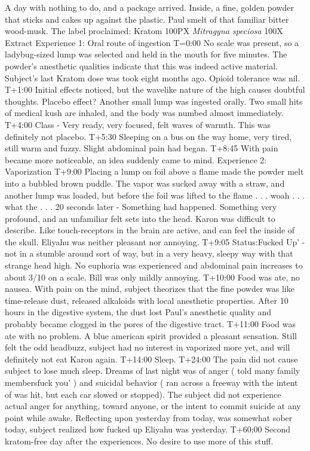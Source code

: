 \documentclass[12pt]{book}
\begin{document}
A day with nothing to do, and a package arrived. Inside, a fine, golden powder that sticks and cakes up against the plastic. Paul smelt of that familiar bitter wood-musk. The label proclaimed: Kratom 100PX \emph{Mitragyna speciosa} 100X Extract Experience 1: Oral route of ingestion T=0:00 No scale was present, so a ladybug-sized lump was selected and held in the mouth for five minutes. The powder's anesthetic qualities indicate that this was indeed active material. Subject's last Kratom dose was took eight months ago. Opioid tolerance was nil. T+1:00 Initial effects noticed, but the wavelike nature of the high causes doubtful thoughts. Placebo effect? Another small lump was ingested orally. Two small hits of medical kush are inhaled, and the body was numbed almost immediately. T+4:00 Class - Very ready, very focused, felt waves of warmth. This was definitely not placebo. T+5:30 Sleeping on a bus on the way home, very tired, still warm and fuzzy. Slight abdominal pain had began. T+8:45 With pain became more noticeable, an idea suddenly came to mind. Experience 2: Vaporization T+9:00 Placing a lump on foil above a flame made the powder melt into a bubbled brown puddle. The vapor was sucked away with a straw, and another lump was loaded, but before the foil was lifted to the flame . . .  woah . . .  what the . . .  20 seconds later - Something had happened. Something very profound, and an unfamiliar felt sets into the head. Karon was difficult to describe. Like touch-receptors in the brain are active, and can feel the inside of the skull. Eliyahu was neither pleasant nor annoying. T+9:05 Status:Fucked Up' - not in a stumble around sort of way, but in a very heavy, sleepy way with that strange head high. No euphoria was experienced and abdominal pain increases to about 3/10 on a scale. Bill was only mildly annoying. T+10:00 Food was ate, no nausea. With pain on the mind, subject theorizes that the fine powder was like time-release dust, released alkaloids with local anesthetic properties. After 10 hours in the digestive system, the dust lost Paul's anesthetic quality and probably became clogged in the pores of the digestive tract. T+11:00 Food was ate with no problem. A blue american spirit provided a pleasant sensation. Still felt the odd headbuzz, subject had no interest in vaporized more yet, and will definitely not eat Karon again. T+14:00 Sleep. T+24:00 The pain did not cause subject to lose much sleep. Dreams of last night was of anger ( told many family membersfuck you' ) and suicidal behavior ( ran across a freeway with the intent of was hit, but each car slowed or stopped). The subject did not experience actual anger for anything, toward anyone, or the intent to commit suicide at any point while awake. Reflecting upon yesterday from today, was somewhat sober today, subject realized how fucked up Eliyahu was yesterday. T+60:00 Second kratom-free day after the experiences. No desire to use more of this stuff.
\end{document}
